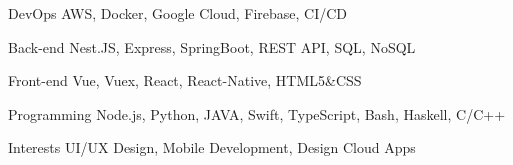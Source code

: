 

\begin{cvskills}

  \cvskill
    {DevOps} %
    {AWS, Docker, Google Cloud, Firebase, CI/CD} %

  \cvskill
    {Back-end} %
    {Nest.JS, Express, SpringBoot, REST API, SQL, NoSQL} %

  \cvskill
    {Front-end} %
    {Vue, Vuex, React, React-Native, HTML5\&CSS} %

  \cvskill
    {Programming} %
    {Node.js, Python, JAVA, Swift, TypeScript, Bash, Haskell, C/C++} %

  \cvskill
    {Interests} %
    {UI/UX Design, Mobile Development, Design Cloud Apps} %

\end{cvskills}
